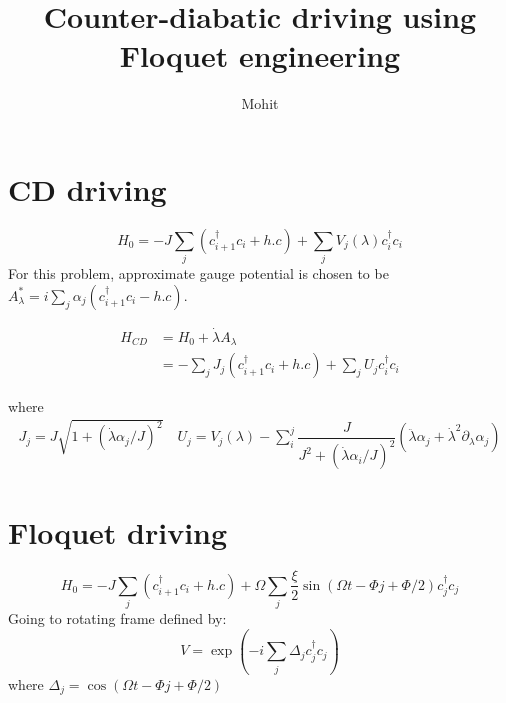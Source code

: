 \documentclass[11pt,a4paper]{article}
\author{Mohit}
\title{Counter-diabatic driving using Floquet engineering}
\begin{document}
\maketitle

\section{CD driving}
 \begin{equation}
 H_0= - J \sum_j (c^{\dagger}_{i+1} c_i+ h.c) + \sum_j V_j (\lambda) c^{\dagger}_{i} c_i
 \end{equation}
For this problem, approximate gauge potential is chosen to be $A_{\lambda}^*= i \sum_j \alpha_j (c^{\dagger}_{i+1} c_i- h.c)$.

\begin{align*}
H_{CD}&= H_0 + \dot{\lambda} A_{\lambda}\\
&=-  \sum_j J_j (c^{\dagger}_{i+1} c_i+ h.c) + \sum_j U_j  c^{\dagger}_{i} c_i
\end{align*}

where 
\begin{align*}
J_j= J \sqrt{1 + (\dot{\lambda} \alpha_j/J)^2} \quad U_j = V_j( \lambda) - \sum_i^j \dfrac{J}{J^2 + (\dot{\lambda} \alpha_i/J)^2} (\ddot{\lambda} \alpha_j + \dot{\lambda}^2 \partial_{\lambda} \alpha_j)
\end{align*}
\section{Floquet driving}

 \begin{equation}
 H_0= - J \sum_j (c^{\dagger}_{i+1} c_i+ h.c) + \Omega \sum_j \dfrac{\xi}{2}  \sin (\Omega t - \Phi j + \Phi/2) c^{\dagger}_{j} c_j
 \end{equation}
Going to rotating frame defined by:
\begin{equation}
V= \exp( - i \sum_j \Delta_j c^{\dagger}_{j} c_j)
\end{equation}
where $\Delta_j= \cos (\Omega t - \Phi j + \Phi/2)$
 


%
\end{document}

